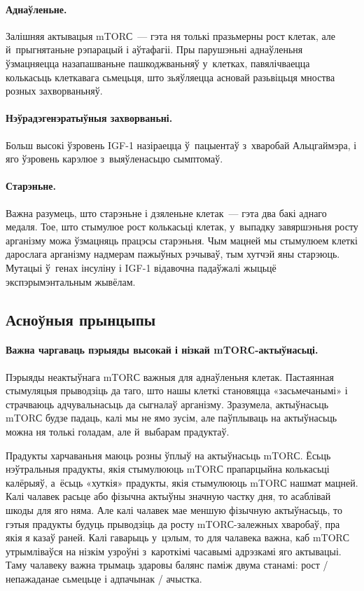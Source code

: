 \paragraph{Аднаўленьне.}
Залішняя актывацыя mTORС~--- гэта ня толькі празьмерны рост клетак, але й~прыгнятаньне рэпарацый і аўтафагіі. Пры парушэньні аднаўленьня ўзмацняецца назапашваньне пашкоджваньняў у~клетках, павялічваецца колькасьць клеткавага сьмецьця, што зьяўляецца асновай разьвіцьця мноства розных захворваньняў.

\paragraph{Нэўрадэгенэратыўныя захворваньні.}
Больш высокі ўзровень IGF-1 назіраецца ў~пацыентаў з~хваробай Альцгаймэра, і яго ўзровень карэлюе з~выяўленасьцю сымптомаў.

\paragraph{Старэньне.}
Важна разумець, што старэньне і дзяленьне клетак~--- гэта два бакі аднаго медаля. Тое, што стымулюе рост колькасьці клетак, у~выпадку завяршэньня росту арганізму можа ўзмацняць працэсы старэньня. Чым мацней мы стымулюем клеткі дарослага арганізму надмерам пажыўных рэчываў, тым хутчэй яны старэюць. Мутацыі ў~генах інсуліну і IGF-1 відавочна падаўжалі жыцьцё экспэрымэнтальным жывёлам.

\subsection{Асноўныя прынцыпы}

\paragraph{Важна чаргаваць пэрыяды высокай і нізкай mTORС-ак\-тыў\-нась\-ці.}
Пэрыяды неактыўнага mTORС важныя для аднаўленьня клетак. Пастаянная стымуляцыя прыводзіць да таго, што нашы клеткі становяцца «засьмечанымі» і страчваюць адчувальнасьць да сыгналаў арганізму. Зразумела, актыўнасьць mTORС будзе падаць, калі мы не ямо зусім, але паўплываць на актыўнасьць можна ня толькі голадам, але й~выбарам прадуктаў.

Прадукты харчаваньня маюць розны ўплыў на актыўнасьць mTORС. Ёсьць нэўтральныя прадукты, якія стымулююць mTORС прапарцыйна колькасьці калёрыяў, а~ёсьць «хуткія» прадукты, якія стымулююць mTORС нашмат мацней. Калі чалавек расьце або фізычна актыўны значную частку дня, то асаблівай шкоды для яго няма. Але калі чалавек мае меншую фізычную актыўнасьць, то гэтыя прадукты будуць прыводзіць да росту mTORС-залежных хваробаў, пра якія я казаў раней. Калі гаварыць у~цэлым, то для чалавека важна, каб mTORС утрымліваўся на нізкім узроўні з~кароткімі часавымі адрэзкамі яго актывацыі. Таму чалавеку важна трымаць здаровы балянс паміж двума станамі: рост / непажаданае сьмецьце і адпачынак / ачыстка.

